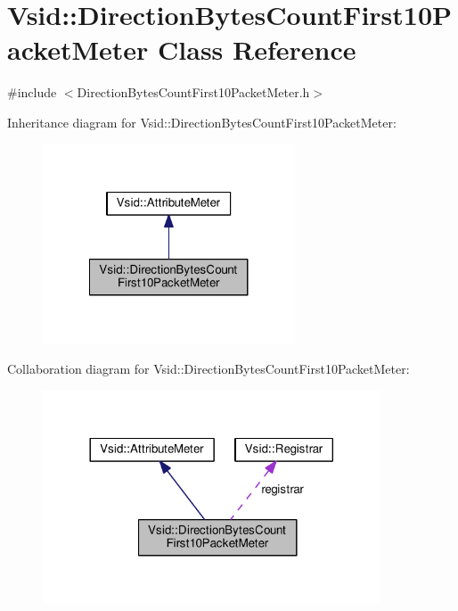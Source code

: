 \hypertarget{class_vsid_1_1_direction_bytes_count_first10_packet_meter}{\section{Vsid\-:\-:Direction\-Bytes\-Count\-First10\-Packet\-Meter Class Reference}
\label{class_vsid_1_1_direction_bytes_count_first10_packet_meter}
}


{\ttfamily \#include $<$Direction\-Bytes\-Count\-First10\-Packet\-Meter.\-h$>$}



Inheritance diagram for Vsid\-:\-:Direction\-Bytes\-Count\-First10\-Packet\-Meter\-:
\nopagebreak
\begin{figure}[H]
\begin{center}
\leavevmode
\includegraphics[width=212pt]{class_vsid_1_1_direction_bytes_count_first10_packet_meter__inherit__graph}
\end{center}
\end{figure}


Collaboration diagram for Vsid\-:\-:Direction\-Bytes\-Count\-First10\-Packet\-Meter\-:
\nopagebreak
\begin{figure}[H]
\begin{center}
\leavevmode
\includegraphics[width=284pt]{class_vsid_1_1_direction_bytes_count_first10_packet_meter__coll__graph}
\end{center}
\end{figure}

